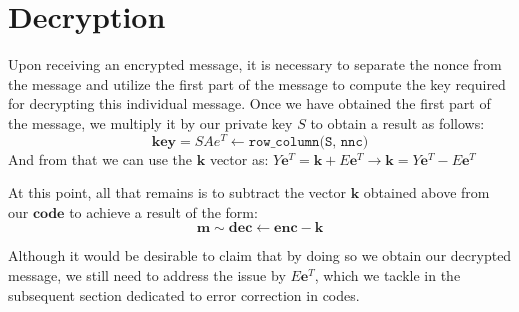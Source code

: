 \section{Decryption}
Upon receiving an encrypted message, it is necessary to separate the nonce from the message and utilize the first part of the message to compute the key required for decrypting this individual message. Once we have obtained the first part of the message, we multiply it by our private key $S$ to obtain a result as follows:
$$
\mathbf{key}=SAe^T\leftarrow \texttt{row\_column(S, nnc)}
$$
And from that we can use the \(\mathbf{k}\) vector as: $Y\mathbf{e}^T=\mathbf{k} + E\mathbf{e}^T\rightarrow \mathbf{k} = Y\mathbf{e}^T - E\mathbf{e}^T$

At this point, all that remains is to subtract the vector $\mathbf{k}$ obtained above from our $\mathbf{code}$ to achieve a result of the form:
$$
\mathbf{m}\sim \mathbf{dec}\leftarrow \mathbf{enc} - \mathbf{k}
$$

Although it would be desirable to claim that by doing so we obtain our decrypted message, we still need to address the issue by $E\mathbf{e}^T$, which we tackle in the subsequent section dedicated to error correction in codes.